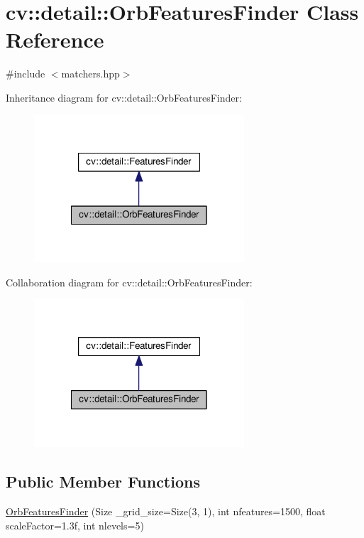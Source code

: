 \hypertarget{classcv_1_1detail_1_1OrbFeaturesFinder}{\section{cv\-:\-:detail\-:\-:Orb\-Features\-Finder Class Reference}
\label{classcv_1_1detail_1_1OrbFeaturesFinder}
}


{\ttfamily \#include $<$matchers.\-hpp$>$}



Inheritance diagram for cv\-:\-:detail\-:\-:Orb\-Features\-Finder\-:\nopagebreak
\begin{figure}[H]
\begin{center}
\leavevmode
\includegraphics[width=222pt]{classcv_1_1detail_1_1OrbFeaturesFinder__inherit__graph}
\end{center}
\end{figure}


Collaboration diagram for cv\-:\-:detail\-:\-:Orb\-Features\-Finder\-:\nopagebreak
\begin{figure}[H]
\begin{center}
\leavevmode
\includegraphics[width=222pt]{classcv_1_1detail_1_1OrbFeaturesFinder__coll__graph}
\end{center}
\end{figure}
\subsection*{Public Member Functions}
\begin{DoxyCompactItemize}
\item 
\hyperlink{classcv_1_1detail_1_1OrbFeaturesFinder_a9eb067336e6f89e47190dbb862af6eef}{Orb\-Features\-Finder} (Size \-\_\-grid\-\_\-size=Size(3, 1), int nfeatures=1500, float scale\-Factor=1.\-3f, int nlevels=5)
\end{DoxyCompactItemize}
